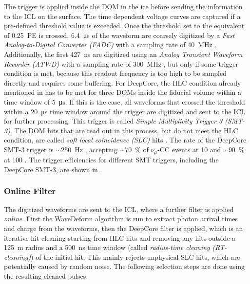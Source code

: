 The trigger is applied inside the DOM in the ice before sending the information to the ICL on the surface. The time dependent voltage curves are captured if a pre-defined threshold value is exceeded. Once the threshold set to the equivalent of \SI{0.25}{PE} is crossed, \SI{6.4}{\micro\second} of the waveform are coarsely digitized by a \textit{Fast Analog-to-Digital Converter (FADC)} with a sampling rate of \SI{40}{\mega\hertz} . Additionally, the first \SI{427}{\nano\second} are digitized using an \textit{Analog Transient Waveform Recorder (ATWD)} with a sampling rate of \SI{300}{\mega\hertz} , but only if some trigger condition is met, because this readout frequency is too high to be sampled directly and requires some buffering. For DeepCore, the HLC condition already mentioned in  has to be met for three DOMs inside the fiducial volume within a time window of \SI{5}{\micro\second}. If this is the case, all waveforms that crossed the threshold within a \SI{20}{\micro\second} time window around the trigger are digitized and sent to the ICL for further processing. This trigger is called \textit{Simple Multiplicity Trigger 3 (SMT-3)}. The DOM hits that are read out in this process, but do not meet the HLC condition, are called \textit{soft local coincidence (SLC)} hits . The rate of the DeepCore SMT-3 trigger is $\sim$\SI{250}{\hertz} , accepting $\sim$\SI{70}{\percent} of $\nu_\mu$-CC events at \SI{10}{\gev} and $\sim$\SI{90}{\percent} at \SI{100}{\gev} . The trigger efficiencies for different SMT triggers, including the DeepCore SMT-3, are shown in .


\subsubsection{Online Filter} 

The digitized waveforms are sent to the ICL, where a further filter is applied \textit{online}. First the WaveDeform algorithm is run to extract photon arrival times and charge from the waveforms, then the DeepCore filter is applied, which is an iterative hit cleaning starting from HLC hits and removing any hits outside a \SI{125}{\meter} radius and a \SI{500}{\nano\second} time window (called \textit{radius-time cleaning (RT-cleaning)}) of the initial hit. This mainly rejects unphysical SLC hits, which are potentially caused by random noise. The following selection steps are done using the resulting cleaned pulses.

